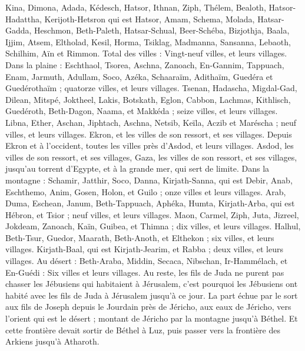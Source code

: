 \begin{multicols}{2}
Kina, Dimona, Adada,
Kédesch, Hatsor, Ithnan,
Ziph, Thélem, Bealoth,
Hatsor-Hadattha, Kerijoth-Hetsron qui est Hatsor,
Amam, Schema, Molada,
Hatsar-Gadda, Heschmon, Beth-Paleth,
Hatsar-Schual, Beer-Schéba, Bizjothja,
Baala, Ijjim, Atsem,
Eltholad, Kesil, Horma,
Tsiklag, Madmanna, Sansanna,
Lebaoth, Schilhim, Aïn et Rimmon. Total des villes : Vingt-neuf villes, et leurs villages.
Dans la plaine : Eschthaol, Tsorea, Aschna,
Zanoach, En-Gannim, Tappuach, Enam,
Jarmuth, Adullam, Soco, Azéka,
Schaaraïm, Adithaïm, Guedéra et Guedérothaïm ; quatorze villes, et leurs villages.
Tsenan, Hadascha, Migdal-Gad,
Dilean, Mitspé, Joktheel,
Lakis, Botskath, Eglon,
Cabbon, Lachmas, Kithlisch,
Guedéroth, Beth-Dagon, Naama, et Makkéda ; seize villes, et leurs villages.
Libna, Ether, Aschan,
Jiphtach, Aschna, Netsib,
Keïla, Aczib et Maréscha ; neuf villes, et leurs villages.
Ekron, et les villes de son ressort, et ses villages.
Depuis Ekron et à l'occident, toutes les villes près d'Asdod, et leurs villages.
Asdod, les villes de son ressort, et ses villages, Gaza, les villes de son ressort, et ses villages, jusqu'au torrent d'Egypte, et à la grande mer, qui sert de limite.
Dans la montagne : Schamir, Jatthir, Soco,
Danna, Kirjath-Sanna, qui est Debir,
Anab, Eschthemo, Anim,
Gosen, Holon, et Guilo ; onze villes et leurs villages.
Arab, Duma, Eschean,
Janum, Beth-Tappuach, Aphéka,
Humta, Kirjath-Arba, qui est Hébron, et Tsior ; neuf villes, et leurs villages.
Maon, Carmel, Ziph, Juta,
Jizreel, Jokdeam, Zanoach,
Kaïn, Guibea, et Thimna ; dix villes, et leurs villages.
Halhul, Beth-Tsur, Guedor,
Maarath, Beth-Anoth, et Elthekon ; six villes, et leurs villages.
Kirjath-Baal, qui est Kirjath-Jearim, et Rabba ; deux villes, et leurs villages.
Au désert : Beth-Araba, Middin, Secaca,
Nibschan, Ir-Hammélach, et En-Guédi : Six villes et leurs villages.
Au reste, les fils de Juda ne purent pas chasser les Jébusiens qui habitaient à Jérusalem, c'est pourquoi les Jébusiens ont habité avec les fils de Juda à Jérusalem jusqu'à ce jour.
\VerseOne{}La part échue par le sort aux fils de Joseph depuis le Jourdain près de Jéricho, aux eaux de Jéricho, vers l'orient qui est le désert ; montant de Jéricho par la montagne jusqu'à Béthel.
Et cette frontière devait sortir de Béthel à Luz, puis passer vers la frontière des Arkiens jusqu'à Atharoth.

\end{multicols}
